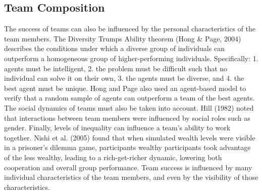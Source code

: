 \subsection{Team Composition}
The success of teams can also be influenced by the personal characteristics of the team members. The Diversity Trumps Ability theorem (Hong \& Page, 2004) describes the conditions under which a diverse group of individuals can outperform a homogeneous group of higher-performing individuals. Specifically: 1. agents must be intelligent, 2. the problem must be difficult such that no individual can solve it on their own, 3. the agents must be diverse, and 4. the best agent must be unique. Hong and Page also used an agent-based model to verify that a random sample of agents can outperform a team of the best agents. The social dynamics of teams must also be taken into account. Hill (1982) noted that interactions between team members were influenced by social roles such as gender. Finally, levels of inequality can influence a team's ability to work together. Nishi et al. (2005) found that when simulated wealth levels were visible in a prisoner's dilemma game, participants wealthy participants took advantage of the less wealthy, leading to a rich-get-richer dynamic, lowering both cooperation and overall group performance. Team success is influenced by many individual characteristics of the team members, and even by the visibility of those characteristics.


